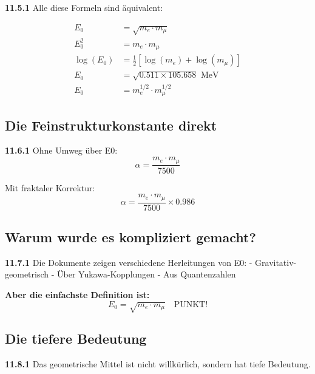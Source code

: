 \noindent \textbf{11.5.1} Alle diese Formeln sind äquivalent:

\begin{align}
	E_0 &= \sqrt{m_e \cdot m_\mu} \\
	E_0^2 &= m_e \cdot m_\mu \\
	\log(E_0) &= \frac{1}{2}[\log(m_e) + \log(m_\mu)] \\
	E_0 &= \sqrt{0.511 \times 105.658} \text{ MeV} \\
	E_0 &= m_e^{1/2} \cdot m_\mu^{1/2}
\end{align}

\subsection{Die Feinstrukturkonstante direkt}

\begin{tcolorbox}[colback=green!5!white,colframe=green!75!black,title=\textbf{Die direkteste Formel}]
	\noindent \textbf{11.6.1} Ohne Umweg über E0:
	\begin{equation}
		\boxed{\alpha = \frac{m_e \cdot m_\mu}{7500}}
	\end{equation}
	
	Mit fraktaler Korrektur:
	\begin{equation}
		\boxed{\alpha = \frac{m_e \cdot m_\mu}{7500} \times 0.986}
	\end{equation}
\end{tcolorbox}

\subsection{Warum wurde es kompliziert gemacht?}

\noindent \textbf{11.7.1} Die Dokumente zeigen verschiedene Herleitungen von E0:
- Gravitativ-geometrisch
- Über Yukawa-Kopplungen
- Aus Quantenzahlen

\textbf{Aber die einfachste Definition ist:}
\begin{equation}
	\boxed{E_0 = \sqrt{m_e \cdot m_\mu} \quad \text{PUNKT!}}
\end{equation}

\subsection{Die tiefere Bedeutung}

\noindent \textbf{11.8.1} Das geometrische Mittel ist nicht willkürlich, sondern hat tiefe Bedeutung.

